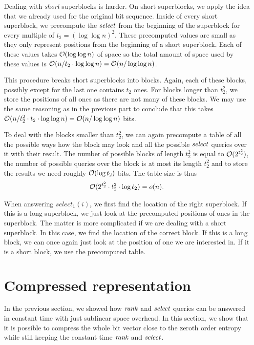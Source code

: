 Dealing with \textit{short} superblocks is harder. On short superblocks, we apply the idea that we
already used for the original bit sequence. Inside of every short superblock, we precompute the
$\mathit{select}$ from the beginning of the superblock for every multiple of $t_2=(\log\log n)^2$. These
precomputed values are small as they only represent positions from the beginning of a short superblock.
Each of these values takes $\mathcal{O}(\log\log n)$ of space so the total amount of space used by these
values is $\mathcal{O}(n/t_2\cdot \log\log n) = \mathcal{O}(n/\log\log n)$.

This procedure breaks short superblocks into blocks. Again, each of these blocks, possibly except for the
last one contains $t_2$ ones. For blocks longer than $t_2^2$, we store the positions of all
ones as there are not many of these blocks. We may use the same reasoning as in the previous
part to conclude that this takes $\mathcal{O}(n/t_2^2\cdot t_2\cdot \log\log n) = \mathcal{O}(n/\log\log n)$
bits.

To deal with the blocks smaller than $t_2^2$, we can again precompute a table of all
the possible ways how the block may look and all the possible $\mathit{select}$ queries over it with
their result. The number of possible blocks of length $t_2^2$ is equal to $\mathcal{O}(2^{t_2^2})$,
the number of possible queries over the block is at most its length $t_2^2$ and to store the
results we need roughly $\mathcal{O}(\log t_2)$ bits. The table size is thus
$$\mathcal{O}(2^{t_2^2}\cdot t_2^2 \cdot \log t_2) = o(n).$$

When answering $select_1(i)$, we first find the location of the right superblock. If this
is a long superblock, we just look at the precomputed positions of ones in the superblock.
The matter is more complicated if we are dealing with a short superblock. In this case, we find
the location of the correct block. If this is a long block, we can once again just look
at the position of one we are interested in. If it is a short block, we use the precomputed
table.

\section{Compressed representation}
\label{section:compressed_bv}

In the previous section, we showed how $\mathit{rank}$ and $\mathit{select}$ queries can be answered in constant
time with just sublinear space overhead. In this section, we show that it is possible to compress
the whole bit vector close to the zeroth order entropy while still keeping the constant time $\mathit{rank}$
and $\mathit{select}$.

